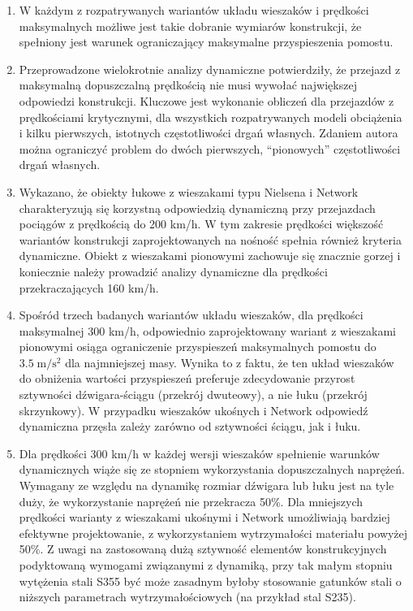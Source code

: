 \begin{enumerate}
	
\item W każdym z rozpatrywanych wariantów układu wieszaków i prędkości maksymalnych możliwe jest takie dobranie wymiarów konstrukcji, że spełniony jest warunek ograniczający maksymalne przyspieszenia pomostu.

\item Przeprowadzone wielokrotnie analizy dynamiczne potwierdziły, że przejazd z maksymalną dopuszczalną prędkością nie musi wywołać największej odpowiedzi konstrukcji. Kluczowe jest wykonanie obliczeń dla przejazdów z prędkościami krytycznymi, dla wszystkich rozpatrywanych modeli obciążenia i kilku pierwszych, istotnych częstotliwości drgań własnych. Zdaniem autora można ograniczyć problem do dwóch pierwszych, \enquote{pionowych} częstotliwości drgań własnych.
	
\item Wykazano, że obiekty łukowe z wieszakami typu Nielsena i Network charakteryzują się korzystną odpowiedzią dynamiczną przy przejazdach pociągów z prędkością do 200 km/h. W tym zakresie prędkości większość wariantów konstrukcji zaprojektowanych na nośność spełnia również kryteria dynamiczne. Obiekt z wieszakami pionowymi zachowuje się znacznie gorzej i koniecznie należy prowadzić analizy dynamiczne dla prędkości przekraczających 160 km/h. 

\item Spośród trzech badanych wariantów układu wieszaków, dla prędkości maksymalnej 300 km/h, odpowiednio zaprojektowany wariant z wieszakami pionowymi osiąga ograniczenie przyspieszeń maksymalnych pomostu do $3.5\;\mathrm{m/s^2}$ dla najmniejszej masy. Wynika to z faktu, że ten układ wieszaków do obniżenia wartości przyspieszeń preferuje zdecydowanie przyrost sztywności dźwigara-ściągu (przekrój dwuteowy), a nie łuku (przekrój skrzynkowy). W przypadku wieszaków ukośnych i Network odpowiedź dynamiczna przęsła zależy zarówno od sztywności ściągu, jak i łuku.

\item Dla prędkości 300 km/h w każdej wersji wieszaków spełnienie warunków dynamicznych wiąże się ze stopniem wykorzystania dopuszczalnych naprężeń. Wymagany ze względu na dynamikę rozmiar dźwigara lub łuku jest na tyle duży, że wykorzystanie naprężeń nie przekracza 50\%. Dla mniejszych prędkości warianty z wieszakami ukośnymi i Network umożliwiają bardziej efektywne projektowanie, z wykorzystaniem wytrzymałości materiału powyżej 50\%. Z uwagi na zastosowaną dużą sztywność elementów konstrukcyjnych podyktowaną wymogami związanymi z dynamiką, przy tak małym stopniu wytężenia stali S355 być może zasadnym byłoby stosowanie gatunków stali o niższych parametrach wytrzymałościowych (na przykład stal S235).


\end{enumerate}
